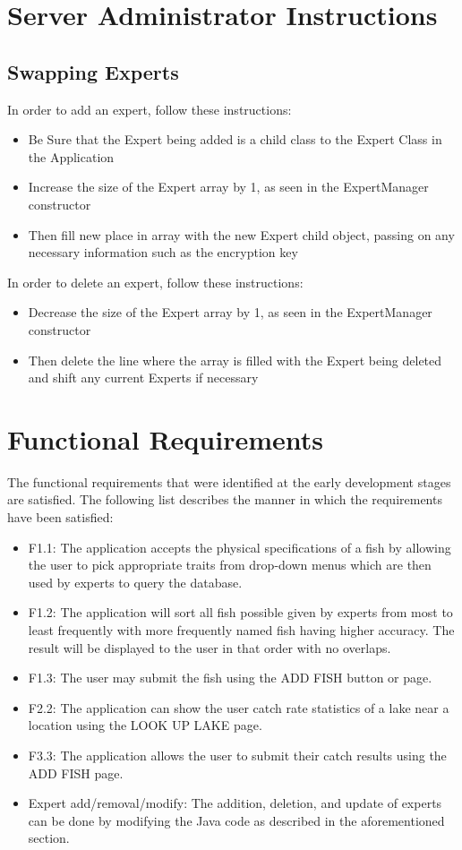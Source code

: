 \documentclass{article}
\begin{document}
\section{Server Administrator Instructions}

\subsection{Swapping Experts}
In order to add an expert, follow these instructions:
\begin{itemize} 
	\item Be Sure that the Expert being added is a child class to the Expert Class in the Application
	\item Increase the size of the Expert array by 1, as seen in the ExpertManager constructor
	\item Then fill new place in array with the new Expert child object, passing on any necessary information such as the encryption key
\end{itemize}
In order to delete an expert, follow these instructions:
\begin{itemize} 
	\item Decrease the size of the Expert array by 1, as seen in the ExpertManager constructor
	\item Then delete the line where the array is filled with the Expert being deleted and shift any current Experts if necessary 
\end{itemize}

\section{Functional Requirements}
The functional requirements that were identified at the early development stages are satisfied. The following list describes the manner in which the requirements have been satisfied:

\begin{itemize} 
	\item F1.1: The application accepts the physical specifications of a fish by allowing the user to pick appropriate traits from
	drop-down menus which are then used by experts to query the database.
	\item F1.2: The application will sort all fish possible given by experts from most to least frequently with more frequently named fish having higher
	accuracy. The result will be displayed to the user in that order with no overlaps.
	\item F1.3: The user may submit the fish using the ADD FISH button or page.
	\item F2.2: The application can show the user catch rate statistics of a lake near a location using the LOOK UP LAKE page.
	\item F3.3: The application allows the user to submit their catch results using the ADD FISH page.
	\item Expert add/removal/modify: The addition, deletion, and update of experts can be done by modifying the Java code as
	described in the aforementioned section.
\end{itemize}

\newpage
\listoffigures
\end{document}
